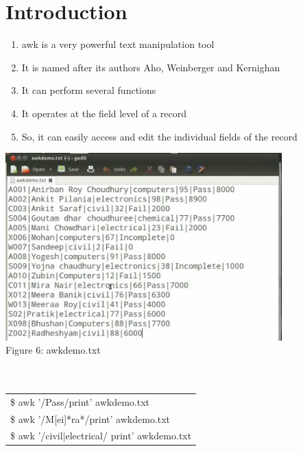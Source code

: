 \documentclass[12pt, a4paper]{report}
\begin{document}
\section{Introduction}
\begin{enumerate}
\item awk is a very powerful text manipulation tool
\item It is named after its authors Aho, Weinberger and Kernighan
\item It can perform several functions
\item It operates at the field level of a record
\item So, it can easily access and edit the individual fields of the record
\end{enumerate}
\includegraphics[width=0.8\textwidth]{19_awk.jpg}\\
Figure 6: awkdemo.txt\\
\\ \\
\begin{tabular}{|l|}\hline
\$ awk '/Pass/{print}' awkdemo.txt\\
\$ awk '/M[ei]*ra*/{print}' awkdemo.txt\\
\$ awk '/civil$|$electrical/ {print}' awkdemo.txt\\ \hline
\end{tabular}
\\ \\ 
\end{document}
